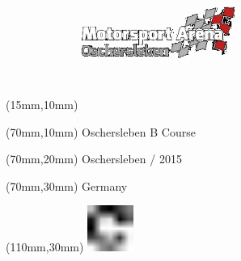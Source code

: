 \null\newpage
\begin{textblock*}{50mm}(15mm,10mm)%
\includegraphics[width=50mm]{LG/OSC.png}
\end{textblock*}
\begin{textblock*}{130mm}(70mm,10mm)%
{\fontsize{20}{20}\selectfont Oschersleben B Course}\\
\end{textblock*}
\begin{textblock*}{120mm}(70mm,20mm)%
{\fontsize{16}{16}\selectfont Oschersleben / 2015}\\
\end{textblock*}
\begin{textblock*}{120mm}(70mm,30mm)%
{\fontsize{12}{12}\selectfont Germany}
\end{textblock*}
\begin{textblock*}{30mm}(110mm,30mm)%
\centering
\includegraphics[height=15mm]{icons/fa-rotate-right.pdf}
\end{textblock*}
